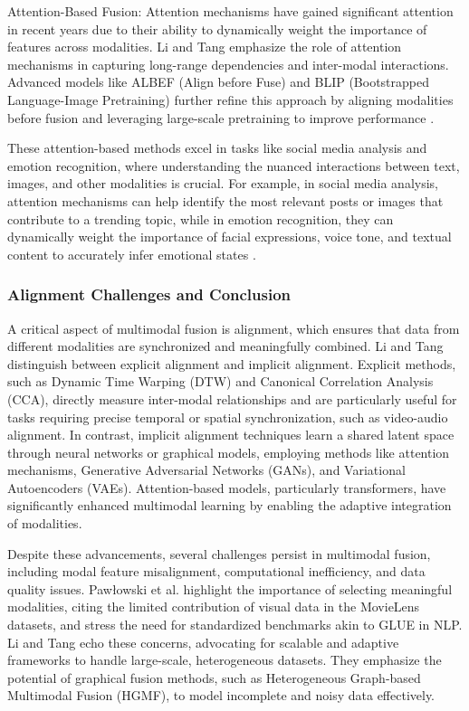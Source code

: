 Attention-Based Fusion: Attention mechanisms have gained significant attention in recent years due to their ability to dynamically weight the importance of features across modalities. Li and Tang emphasize the role of attention mechanisms in capturing long-range dependencies and inter-modal interactions. Advanced models like ALBEF (Align before Fuse) and BLIP (Bootstrapped Language-Image Pretraining) further refine this approach by aligning modalities before fusion and leveraging large-scale pretraining to improve performance \cite{li2021alignfusevisionlanguage, li2022blipbootstrappinglanguageimagepretraining}.
\newline

These attention-based methods excel in tasks like social media analysis and emotion recognition, where understanding the nuanced interactions between text, images, and other modalities is crucial. For example, in social media analysis, attention mechanisms can help identify the most relevant posts or images that contribute to a trending topic, while in emotion recognition, they can dynamically weight the importance of facial expressions, voice tone, and textual content to accurately infer emotional states \cite{poria_review_2017}.

\subsubsection{Alignment Challenges and Conclusion}
A critical aspect of multimodal fusion is alignment, which ensures that data from different modalities are synchronized and meaningfully combined. Li and Tang distinguish between explicit alignment and implicit alignment. Explicit methods, such as Dynamic Time Warping (DTW) and Canonical Correlation Analysis (CCA), directly measure inter-modal relationships and are particularly useful for tasks requiring precise temporal or spatial synchronization, such as video-audio alignment. In contrast, implicit alignment techniques learn a shared latent space through neural networks or graphical models, employing methods like attention mechanisms, Generative Adversarial Networks (GANs), and Variational Autoencoders (VAEs). Attention-based models, particularly transformers, have significantly enhanced multimodal learning by enabling the adaptive integration of modalities.
\newline

Despite these advancements, several challenges persist in multimodal fusion, including modal feature misalignment, computational inefficiency, and data quality issues. Pawłowski et al. highlight the importance of selecting meaningful modalities, citing the limited contribution of visual data in the MovieLens datasets, and stress the need for standardized benchmarks akin to GLUE in NLP. Li and Tang echo these concerns, advocating for scalable and adaptive frameworks to handle large-scale, heterogeneous datasets. They emphasize the potential of graphical fusion methods, such as Heterogeneous Graph-based Multimodal Fusion (HGMF), to model incomplete and noisy data effectively.


